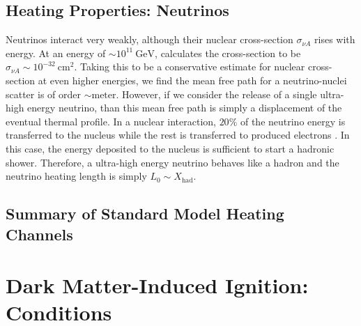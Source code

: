 \documentclass[twocolumn,preprintnumbers,amsmath,amssymb,prl, superscriptaddress]{revtex4}
\newcommand{\GeV}{\text{GeV}}
\newcommand{\cm}{\text{cm}}
\begin{document}
\subsection{Heating Properties: Neutrinos}

Neutrinos interact very weakly, although their nuclear cross-section $\sigma_{\nu A}$ rises with energy.
At an energy of $\sim 10^{11} ~\GeV$, \cite{Formaggio:2013kya} calculates the cross-section to be $\sigma_{\nu A} \sim 10^{-32} ~\cm^2$.
Taking this to be a conservative estimate for nuclear cross-section at even higher energies, we find the mean free path for a neutrino-nuclei scatter is of order $\sim \text{meter}$.
However, if we consider the release of a single ultra-high energy neutrino, than this mean free path is simply a displacement of the eventual thermal profile.
In a nuclear interaction, $20 \%$ of the neutrino energy is transferred to the nucleus while the rest is transferred to produced electrons \cite{Formaggio:2013kya}.
In this case, the energy deposited to the nucleus is sufficient to start a hadronic shower.
Therefore, a ultra-high energy neutrino behaves like a hadron and the neutrino heating length is simply $L_0 \sim X_\text{had}$.

\subsection{Summary of Standard Model Heating Channels}

\section{Dark Matter-Induced Ignition: Conditions}
\label{sec:DMexplode}
\end{document}
